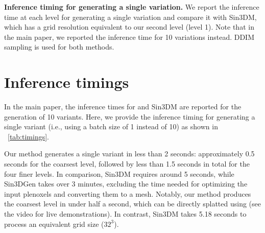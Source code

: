 

\begin{table}[t]
    \centering
   \resizebox{1.\linewidth}{!}{}
    \vspace*{-3mm}
    \caption{\textbf{Inference timing for generating a single variation.} We report the inference time at each level for generating a single variation and compare it with Sin3DM, which has a grid resolution equivalent to our second level (level 1). Note that  in the main paper, we reported the inference time for 10 variations instead. DDIM sampling is used for both methods.\vspace*{-3mm}} 
    \label{tab:timings}
\end{table}

\section{Inference timings}
\label{sec:add_timings}

In the main paper, the inference times for \ourmethod and Sin3DM are reported for the generation of 10 variants. Here, we provide the inference timing for generating a single variant (i.e., using a batch size of 1 instead of 10) as shown in ~\cref{tab:timings}.

Our method generates a single variant in less than 2 seconds: approximately 0.5 seconds for the coarsest level, followed by less than 1.5 seconds in total for the four finer levels. In comparison, Sin3DM requires around 5 seconds, while Sin3DGen takes over 3 minutes, excluding the time needed for optimizing the input plenoxels and converting them to a mesh. Notably, our method produces the coarsest level in under half a second, which can be directly splatted using \cite{ravi2020pytorch3d} (see the video for live demonstrations). In contrast, Sin3DM\cite{wu2024sindm} takes 5.18 seconds to process an equivalent grid size ($32^3$).


